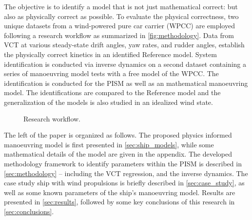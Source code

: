 The objective is to identify a model that is not just mathematical correct: but also as physically correct as possible.
To evaluate the physical correctness, two unique datasets from a wind-powered pure car carrier (WPCC) are employed following a research workflow as summarized in \autoref{fig:methodology}.
Data from VCT at various steady-state drift angles, yaw rates, and rudder angles, establish the physically correct kinetics in an identified Reference model. 
System identification is conducted via inverse dynamics \citep{faber_inverse_2018} on a second dataset containing a series of manoeuvring model tests with a free model of the WPCC. The identification is conducted for the PISM as well as an mathematical manoeuvring model. The identifications are compared to the Reference model and the generalization of the models is also studied in an idealized wind state.
%
\begin{figure}[h]
    \centering
    
    \caption{Research workflow.}
    \label{fig:methodology}
\end{figure}

The left of the paper is organized as follows. The proposed physics informed manoeuvring model is first presented in \autoref{sec:ship_models}, while some mathematical details of the model are given in the appendix. 
The developed methodology framework to identify parameters within the PISM is described in \autoref{sec:methodology} -- including the VCT regression, and the inverse dynamics. The case study ship with wind propulsions is briefly described in \autoref{sec:case_study}, as well as some known parameters of the ship's manoeuvring model. Results are presented in \autoref{sec:results}, followed by some key conclusions of this research in \autoref{sec:conclusions}.
